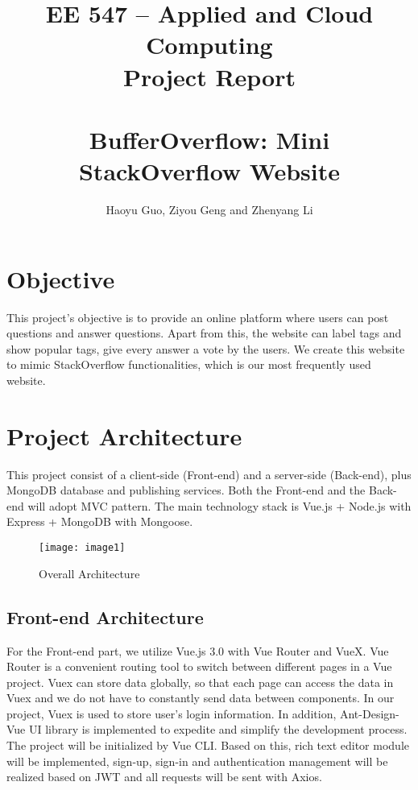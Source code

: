 \documentclass[11pt]{article}
\title{\bf {\small EE 547 -- Applied and Cloud Computing} \\ Project Report \\ \quad \\ BufferOverflow: Mini StackOverflow Website}
\author{Haoyu Guo, Ziyou Geng and Zhenyang Li}
\begin{document}
\maketitle
\newpage
\tableofcontents
\newpage

\section{Objective}

This project's objective is to provide an online platform where users can post questions and answer questions. Apart from this, the website can label tags and show popular tags, give every answer a vote by the users. We create this website to mimic StackOverflow functionalities, which is our most frequently used website. 



\section{Project Architecture}
This project consist of a client-side (Front-end) and a server-side (Back-end), plus MongoDB database and publishing services. Both the Front-end and the Back-end will adopt MVC pattern. The main technology stack is Vue.js + Node.js with Express + MongoDB with Mongoose. 

\begin{figure}[htp]
    \centering
    \texttt{[image: image1]}
    \caption{Overall Architecture}
    \label{fig:galaxy}
\end{figure}


\subsection{Front-end Architecture}

For the Front-end part, we utilize Vue.js 3.0 with Vue Router and VueX. 
Vue Router is a convenient routing tool to switch between different pages in a Vue project. Vuex can store data globally, so that each page can access the data in Vuex and we do not have to constantly send data between components. In our project, Vuex is used to store user's login information. In addition, Ant-Design-Vue UI library is implemented to expedite and simplify the development process. The project will be initialized by Vue CLI. Based on this, rich text editor module will be implemented, sign-up, sign-in and authentication management will be realized based on JWT and all requests will be sent with Axios. 
\end{document}

